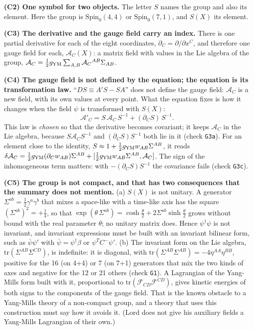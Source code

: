 \documentclass[
  10pt,
]{article}
\begin{document}
\textbf{(C2) One symbol for two objects.} The letter \(S\) names the
group and also its element. Here the group is \(\mathrm{Spin}_0(4,4)\)
or \(\mathrm{Spin}_0(7,1)\), and \(S(X)\) its element.

\textbf{(C3) The derivative and the gauge field carry an index.} There
is one partial derivative for each of the eight coordinates,
\(\partial_C=\partial/\partial x^C\), and therefore one gauge field for
each, \(\mathcal A_C(X)\): a matrix field with values in the Lie algebra
of the group,
\(\mathcal A_C=\tfrac12g_{\rm YM}\sum_{A,B}\mathcal A_C{}^{AB}\Sigma_{AB}\).

\textbf{(C4) The gauge field is not defined by the equation; the
equation is its transformation law.} ``\(DS\equiv A'S-SA\)'' does not
define the gauge field: \(\mathcal A_C\) is a new field, with its own
values at every point. What the equation fixes is how it changes when
the field \(\psi\) is transformed with \(S(X)\):
\[\mathcal A'_C=S\,\mathcal A_C\,S^{-1}+(\partial_CS)\,S^{-1}.\] This
law is \emph{chosen} so that the derivative becomes covariant; it keeps
\(\mathcal A_C\) in the Lie algebra, because \(S\mathcal A_CS^{-1}\) and
\((\partial_CS)S^{-1}\) both lie in it (check \texttt{G3a}). For an
element close to the identity,
\(S\approx1+\tfrac12g_{\rm YM}w_{AB}\Sigma^{AB}\), it reads
\(\delta\mathcal A_C=\tfrac12g_{\rm YM}(\partial_Cw_{AB})\Sigma^{AB}+[\tfrac12g_{\rm YM}w_{AB}\Sigma^{AB},\mathcal A_C]\).
The sign of the inhomogeneous term matters: with
\(-(\partial_CS)S^{-1}\) the covariance fails (check \texttt{G3c}).

\textbf{(C5) The group is not compact, and that has two consequences
that the summary does not mention.} (a) \(S(X)\) is not unitary. A
generator \(\Sigma^{ab}=\tfrac12\gamma^a\gamma^b\) that mixes a
space-like with a time-like axis has the square
\((\Sigma^{ab})^2=+\tfrac14\), so that
\(\exp(\theta\,\Sigma^{ab})=\cosh\tfrac\theta2+2\Sigma^{ab}\sinh\tfrac\theta2\)
grows without bound with the real parameter \(\theta\); no unitary
matrix does. Hence \(\psi^\dagger\psi\) is not invariant, and invariant
expressions must be built with an invariant bilinear form, such as
\(\bar\psi\psi'\) with \(\bar\psi=\psi^\dagger\beta\) or
\(\psi^TC^-\psi'\). (b) The invariant form on the Lie algebra,
\(\mathrm{tr}(\Sigma^{AB}\Sigma^{CD})\), is indefinite: it is diagonal,
with \(\mathrm{tr}(\Sigma^{AB}\Sigma^{AB})=-4\eta^{AA}\eta^{BB}\),
positive for the 16 (on 4+4) or 7 (on 7+1) generators that mix the two
kinds of axes and negative for the 12 or 21 others (check \texttt{G1}).
A Lagrangian of the Yang-Mills form built with it, proportional to
\(\mathrm{tr}(\mathcal F_{CD}\mathcal F^{CD})\), gives kinetic energies
of both signs to the components of the gauge field. That is the known
obstacle to a Yang-Mills theory of a non-compact group, and a theory
that uses this construction must say how it avoids it. (Lord does not
give his auxiliary fields a Yang-Mills Lagrangian of their own.)
\end{document}
